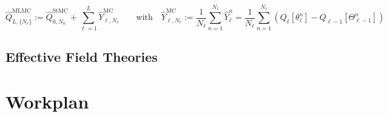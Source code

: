 \documentclass[11pt]{article}
\begin{document}
\begin{equation}
  \hat{Q}_{L,\{N_\ell\}}^{\text{MLMC}} := \hat{Q}_{0,N_0}^{\text{StMC}} + \sum_{\ell=1}^L \hat{Y}_{\ell,N_\ell}^{\text{MC}}\qquad\text{with}\quad
  \hat{Y}_{\ell,N_\ell}^{\text{MC}} := \frac{1}{N_\ell}\sum_{n=1}^{N_\ell} \hat{Y}_\ell^n = \frac{1}{N_\ell}\sum_{n=1}^{N_\ell} \left(Q_\ell[\theta_\ell^n] - Q_{\ell-1}[\Theta_{\ell-1}^n]\right)
\end{equation}


\subsection{Effective Field Theories}


\section{Workplan}

{\footnotesize
  
}
\end{document}
